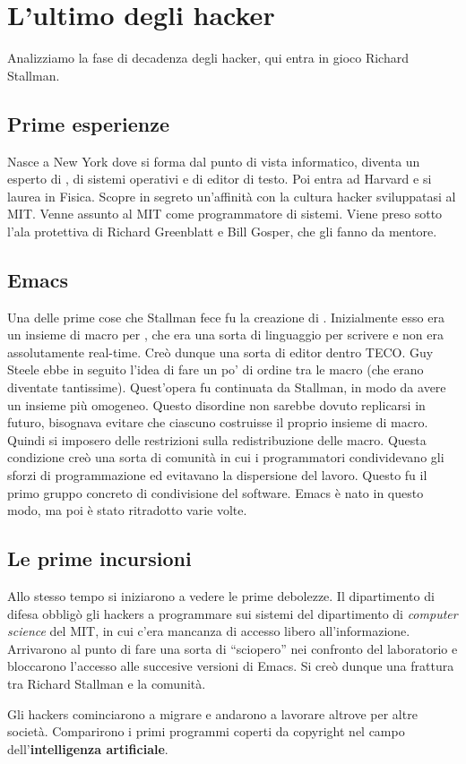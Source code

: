 \section{L'ultimo degli hacker}

Analizziamo la fase di decadenza degli hacker, qui entra in gioco Richard Stallman.

\subsection{Prime esperienze}

Nasce a New York dove si forma dal punto di vista informatico, diventa un esperto di , di sistemi operativi e di editor di testo. Poi entra ad Harvard e si laurea in Fisica. Scopre in segreto un'affinità con la cultura hacker sviluppatasi al MIT. Venne assunto al MIT come programmatore di sistemi. Viene preso sotto l'ala protettiva di Richard Greenblatt e Bill Gosper, che gli fanno da mentore.

\subsection{Emacs}

Una delle prime cose che Stallman fece fu la creazione di . Inizialmente esso era un insieme di macro per , che era una sorta di linguaggio per scrivere e non era assolutamente real-time. Creò dunque una sorta di editor dentro TECO. Guy Steele ebbe in seguito l'idea di fare un po' di ordine tra le macro (che erano diventate tantissime). Quest'opera fu continuata da Stallman, in modo da avere un insieme più omogeneo. Questo disordine non sarebbe dovuto replicarsi in futuro, bisognava evitare che ciascuno costruisse il proprio insieme di macro. Quindi si imposero delle restrizioni sulla redistribuzione delle macro. Questa condizione creò una sorta di comunità in cui i programmatori condividevano gli sforzi di programmazione ed evitavano la dispersione del lavoro. Questo fu il primo gruppo concreto di condivisione del software. Emacs è nato in questo modo, ma poi è stato ritradotto varie volte.

\subsection{Le prime incursioni}

Allo stesso tempo si iniziarono a vedere le prime debolezze. Il dipartimento di difesa obbligò gli hackers a programmare sui sistemi del dipartimento di \textit{computer science} del MIT, in cui c'era mancanza di accesso libero all'informazione. Arrivarono al punto di fare una sorta di ``sciopero'' nei confronto del laboratorio e bloccarono l'accesso alle succesive versioni di Emacs. Si creò dunque una frattura tra Richard Stallman e la comunità.

Gli hackers cominciarono a migrare e andarono a lavorare altrove per altre società. Comparirono i primi programmi coperti da copyright nel campo dell'\textbf{intelligenza artificiale}.